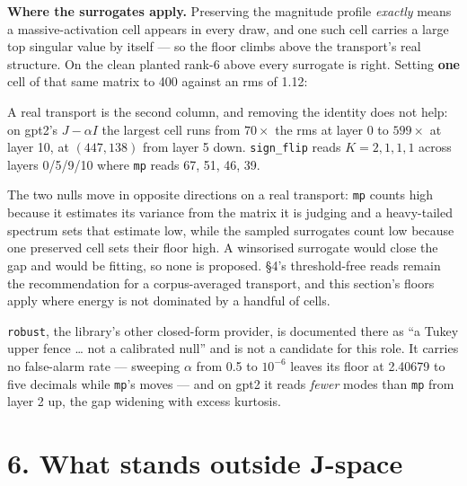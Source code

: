 \documentclass[10pt,letterpaper,twocolumn]{article}
\begin{document}
\textbf{Where the surrogates apply.} Preserving the magnitude profile \emph{exactly} means a massive-activation cell appears in every draw, and one such cell carries a large top singular value by itself --- so the floor climbs above the transport's real structure. On the clean planted rank-6 above every surrogate is right. Setting \textbf{one} cell of that same matrix to 400 against an rms of 1.12:


A real transport is the second column, and removing the identity does not help: on gpt2's \(J-\alpha I\) the largest cell runs from \(70\times\) the rms at layer 0 to \(599\times\) at layer 10, at \((447,138)\) from layer 5 down. \texttt{sign\_\allowbreak{}flip} reads \(K = 2, 1, 1, 1\) across layers 0/5/9/10 where \texttt{mp} reads 67, 51, 46, 39.

The two nulls move in opposite directions on a real transport: \texttt{mp} counts high because it estimates its variance from the matrix it is judging and a heavy-tailed spectrum sets that estimate low, while the sampled surrogates count low because one preserved cell sets their floor high. A winsorised surrogate would close the gap and would be fitting, so none is proposed. §4's threshold-free reads remain the recommendation for a corpus-averaged transport, and this section's floors apply where energy is not dominated by a handful of cells.

\texttt{robust}, the library's other closed-form provider, is documented there as ``a Tukey upper fence \ldots{} not a calibrated null'' and is not a candidate for this role. It carries no false-alarm rate --- sweeping \(\alpha\) from 0.5 to \(10^{-6}\) leaves its floor at 2.40679 to five decimals while \texttt{mp}'s moves --- and on gpt2 it reads \emph{fewer} modes than \texttt{mp} from layer 2 up, the gap widening with excess kurtosis.

\section{6. What stands outside J-space}\label{6-what-stands-outside-j-space}
\end{document}
